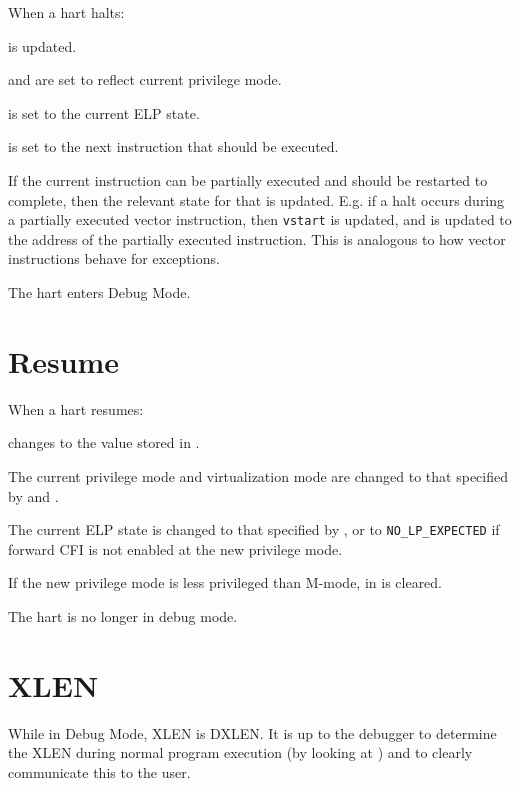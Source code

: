 \begin{steps}{When a hart halts:}
    \item \FcsrDcsrCause is updated.
    \item \FcsrDcsrPrv and \FcsrDcsrV are set to reflect current privilege mode.
    \item \FcsrDcsrElp is set to the current ELP state.
    \item \RcsrDpc is set to the next instruction that should be executed.
    \item If the current instruction can be partially executed and should be
        restarted to complete, then the relevant state for that is updated. E.g.
        if a halt occurs during a partially executed vector instruction, then
        {\tt vstart} is updated, and \RcsrDpc is updated to the address of the
        partially executed instruction. This is analogous to how vector
        instructions behave for exceptions.
    \item The hart enters Debug Mode.
\end{steps}

\section{Resume}

\begin{steps}{When a hart resumes:}
    \item \Rpc changes to the value stored in \RcsrDpc.
    \item The current privilege mode and virtualization mode are changed to that specified by
        \FcsrDcsrPrv and \FcsrDcsrV.
    \item The current ELP state is changed to that specified by \FcsrDcsrElp, or to {\tt NO\_LP\_EXPECTED}
        if forward CFI is not enabled at the new privilege mode.
    \item If the new privilege mode is less privileged than M-mode,
        \FcsrMstatusMprv in \Rmstatus is cleared.
    \item The hart is no longer in debug mode.
\end{steps}

\section{XLEN}

While in Debug Mode, XLEN is DXLEN. It is up to the debugger to determine the
XLEN during normal program execution (by looking at \Rmisa) and to clearly
communicate this to the user.

